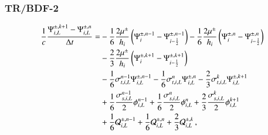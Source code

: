 \iftoggle{DEVELOPERMODE}{

These equations can be solved by solving steady-state S$_2$ equations
of the form of Equations \requ{S2trL} and \requ{S2trR} by making
the following definitions:
\begin{equation}
  \tau = \frac{1}{c\dt} \pec \quad \alpha = \frac{1}{2}\pec
\end{equation}
\begin{multline}
  \tilde{\Q}_{i,L}^{\pm,k}
  = \frac{\Psi\iL^{\pm,n}}{c\dt}
  - \half\frac{2\mu^\pm}{h_i}\fn{\Psi_i^{\pm,n} - \Psi_{i-\half}^{\pm,n}}
  - \half\sigma_{t,i,L}^n\Psi\iL^{\pm,n}\\
  + \half\frac{\sigma_{s,i,L}^n}{2}\phi\iL^n
  + \half\Q\iL^{\pm,n}
  + \half\Q\iL^{\pm,k}
\end{multline}
\begin{multline}
  \tilde{\Q}_{i,R}^{\pm,k}
  = \frac{\Psi\iR^{\pm,n}}{c\dt}
  - \half\frac{2\mu^\pm}{h_i}\fn{\Psi_{i+\half}^{\pm,n} - \Psi_i^{\pm,n}}
  - \half\sigma_{t,i,R}^n\Psi\iR^{\pm,n}\\
  + \half\frac{\sigma_{s,i,R}^n}{2}\phi\iR^n
  + \half\Q\iR^{\pm,n}
  + \half\Q\iR^{\pm,k}
\end{multline}

}{} %

\subsubsection{TR/BDF-2}
\begin{equation}\lequ{S2BDF2fullL}\begin{split}
  \frac{1}{c}\frac{\Psi\iL^{\pm,k+1}-\Psi\iL^{\pm,n}}{\dt} = &
   -\sixth     \frac{2\mu^\pm}{h_i}\fn{\Psi^{\pm,n-1}_i - \Psi^{\pm,n-1}_{i-\half}}
   -\sixth     \frac{2\mu^\pm}{h_i}\fn{\Psi^{\pm,n}_i   - \Psi^{\pm,n}_{i-\half}}\\
  &-\frac{2}{3}\frac{2\mu^\pm}{h_i}\fn{\Psi^{\pm,k+1}_i - \Psi^{\pm,k+1}_{i-\half}}\\
  &-\sixth\sigma_{t,i,L}^{n-1}\Psi\iL^{\pm,n-1}
   -\sixth\sigma_{t,i,L}^{n}  \Psi\iL^{\pm,n}
   -\frac{2}{3}\sigma_{t,i,L}^k\Psi\iL^{\pm,k+1}\\
  &+\sixth\frac{\sigma_{s,i,L}^{n-1}}{2}\phi\iL^{n-1}
   +\sixth\frac{\sigma_{s,i,L}^{n}}{2}  \phi\iL^{n}
   +\frac{2}{3}\frac{\sigma_{s,i,L}^k}{2}\phi\iL^{k+1}\\
  &+\sixth\Q_{i,L}^{\pm,n-1}
   +\sixth\Q_{i,L}^{\pm,n}
   +\frac{2}{3}\Q_{i,L}^{\pm,k} \pec
\end{split}\end{equation}

